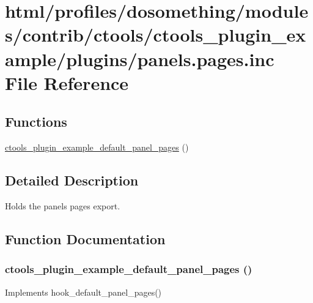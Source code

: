 \hypertarget{panels_8pages_8inc}{
\section{html/profiles/dosomething/modules/contrib/ctools/ctools\_\-plugin\_\-example/plugins/panels.pages.inc File Reference}
\label{panels_8pages_8inc}
}
\subsection*{Functions}
\begin{DoxyCompactItemize}
\item 
\hyperlink{panels_8pages_8inc_ad611f9ee8f8656d968c15b3809e0034c}{ctools\_\-plugin\_\-example\_\-default\_\-panel\_\-pages} ()
\end{DoxyCompactItemize}


\subsection{Detailed Description}
Holds the panels pages export. 

\subsection{Function Documentation}
\hypertarget{panels_8pages_8inc_ad611f9ee8f8656d968c15b3809e0034c}{
\subsubsection[{ctools\_\-plugin\_\-example\_\-default\_\-panel\_\-pages}]{\setlength{\rightskip}{0pt plus 5cm}ctools\_\-plugin\_\-example\_\-default\_\-panel\_\-pages ()}}
\label{panels_8pages_8inc_ad611f9ee8f8656d968c15b3809e0034c}
Implements hook\_\-default\_\-panel\_\-pages() 